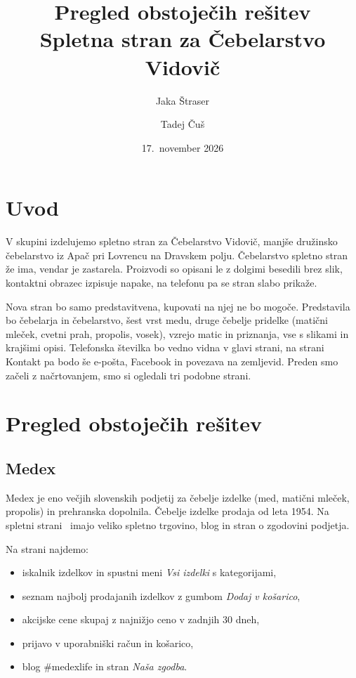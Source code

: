 \documentclass[11pt,a4paper]{article}
\title{Pregled obstoječih rešitev\\[0.3em]
\large Spletna stran za Čebelarstvo Vidovič}
\author{
  Jaka Štraser \and
  Tadej Čuš
}
\date{17.~november 2026}
\begin{document}
\maketitle

\tableofcontents

\section{Uvod}
V skupini izdelujemo spletno stran za Čebelarstvo Vidovič, manjše družinsko čebelarstvo iz Apač pri Lovrencu na Dravskem polju.
Čebelarstvo spletno stran že ima, vendar je zastarela. Proizvodi so opisani le z dolgimi besedili brez slik, kontaktni obrazec izpisuje napake, na telefonu pa se stran slabo prikaže.

Nova stran bo samo predstavitvena, kupovati na njej ne bo mogoče. Predstavila bo čebelarja in čebelarstvo, šest vrst medu, druge čebelje pridelke (matični mleček, cvetni prah, propolis, vosek), vzrejo matic in priznanja, vse s slikami in krajšimi opisi. Telefonska številka bo vedno vidna v glavi strani, na strani Kontakt pa bodo še e-pošta, Facebook in povezava na zemljevid.
Preden smo začeli z načrtovanjem, smo si ogledali tri podobne strani.

\section{Pregled obstoječih rešitev}

\subsection{Medex}
Medex je eno večjih slovenskih podjetij za čebelje izdelke (med, matični mleček, propolis) in prehranska dopolnila. Čebelje izdelke prodaja od leta 1954.
Na spletni strani~\cite{medex} imajo veliko spletno trgovino, blog in stran o zgodovini podjetja.

Na strani najdemo:
\begin{itemize}
  \item iskalnik izdelkov in spustni meni \emph{Vsi izdelki} s kategorijami,
  \item seznam najbolj prodajanih izdelkov z gumbom \emph{Dodaj v košarico},
  \item akcijske cene skupaj z najnižjo ceno v zadnjih 30 dneh,
  \item prijavo v uporabniški račun in košarico,
  \item blog \#medexlife in stran \emph{Naša zgodba}.
\end{itemize}
\end{document}
